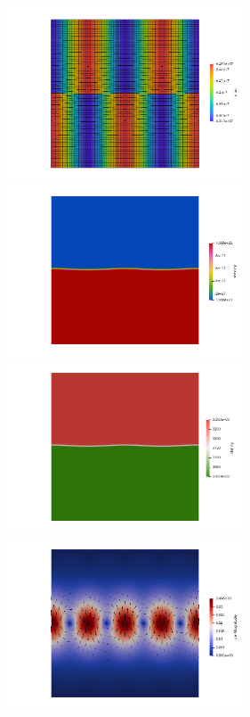 \begin{center}
\includegraphics[width=7cm]{python_codes/fieldstone_72/results/RT/area}
\includegraphics[width=7cm]{python_codes/fieldstone_72/results/RT/eta}\\
\includegraphics[width=7cm]{python_codes/fieldstone_72/results/RT/rho}
\includegraphics[width=7cm]{python_codes/fieldstone_72/results/RT/vel}
\end{center}


